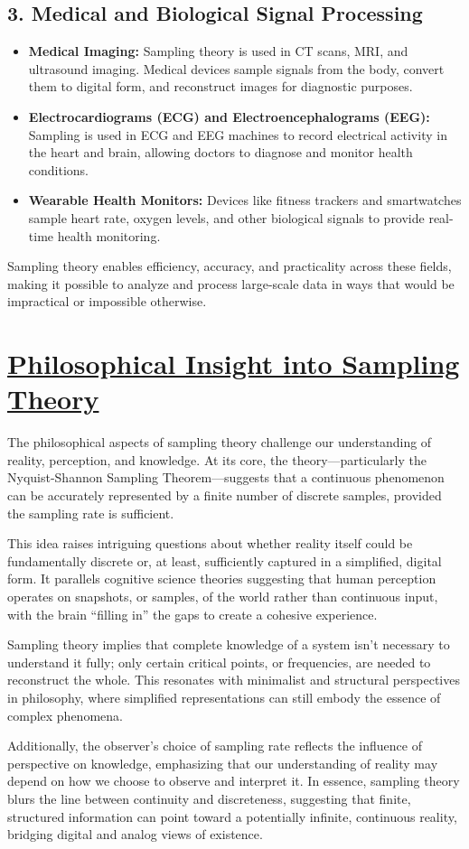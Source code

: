 \documentclass[12pt,a4paper]{report}
\begin{document}
\subsection*{3. Medical and Biological Signal Processing}
\begin{itemize}
    \item \textbf{Medical Imaging:} Sampling theory is used in CT scans, MRI, and ultrasound imaging. Medical devices sample signals from the body, convert them to digital form, and reconstruct images for diagnostic purposes.
    \item \textbf{Electrocardiograms (ECG) and Electroencephalograms (EEG):} Sampling is used in ECG and EEG machines to record electrical activity in the heart and brain, allowing doctors to diagnose and monitor health conditions.
    \item \textbf{Wearable Health Monitors:} Devices like fitness trackers and smartwatches sample heart rate, oxygen levels, and other biological signals to provide real-time health monitoring.
\end{itemize}

\noindent Sampling theory enables efficiency, accuracy, and practicality across these fields, making it possible to analyze and process large-scale data in ways that would be impractical or impossible otherwise.

\newpage

\section*{\underline{\textbf{Philosophical Insight into Sampling Theory}}}

The philosophical aspects of sampling theory challenge our understanding of reality, perception, and knowledge. At its core, the theory—particularly the Nyquist-Shannon Sampling Theorem—suggests that a continuous phenomenon can be accurately represented by a finite number of discrete samples, provided the sampling rate is sufficient.

This idea raises intriguing questions about whether reality itself could be fundamentally discrete or, at least, sufficiently captured in a simplified, digital form. It parallels cognitive science theories suggesting that human perception operates on snapshots, or samples, of the world rather than continuous input, with the brain “filling in” the gaps to create a cohesive experience.

Sampling theory implies that complete knowledge of a system isn’t necessary to understand it fully; only certain critical points, or frequencies, are needed to reconstruct the whole. This resonates with minimalist and structural perspectives in philosophy, where simplified representations can still embody the essence of complex phenomena.

Additionally, the observer’s choice of sampling rate reflects the influence of perspective on knowledge, emphasizing that our understanding of reality may depend on how we choose to observe and interpret it. In essence, sampling theory blurs the line between continuity and discreteness, suggesting that finite, structured information can point toward a potentially infinite, continuous reality, bridging digital and analog views of existence.
\end{document}
